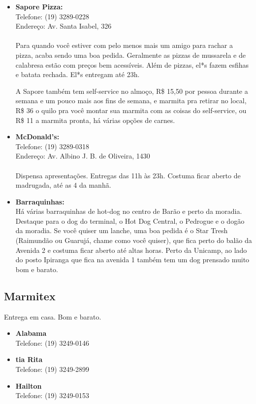 \begin{itemize}
      \item \textbf{Sapore Pizza:}
        \\Telefone: (19) 3289-0228
        \\Endereço: Av. Santa Isabel, 326
        \\\\
        Para quando você estiver com pelo menos mais um amigo para rachar a
        pizza, acaba sendo uma boa pedida. Geralmente as pizzas de mussarela e
        de calabresa estão com preços bem acessíveis. Além de pizzas, el*s fazem
        esfihas e batata rechada. El*s entregam até 23h.

        A Sapore também tem self-service no almoço, R\$ 15,50 por pessoa durante
        a semana e um pouco mais aos fins de semana, e marmita pra retirar no
        local, R\$ 36 o quilo pra você montar sua marmita com as coisas do
        self-service, ou R\$ 11 a marmita pronta, há várias opções de carnes.

    \item   \textbf{McDonald's:}
        \\Telefone: (19) 3289-0318
        \\Endereço: Av. Albino J. B. de Oliveira, 1430
        \\\\
        Dispensa apresentações. Entregas das 11h às 23h. Costuma ficar aberto de
        madrugada, até as 4 da manhã.

    \item   \textbf{Barraquinhas:}
        \\Há várias barraquinhas de hot-dog no centro de Barão e perto da
        moradia. Destaque para o dog do terminal, o Hot Dog Central, o Pedrogue
        e o dogão da moradia. Se você quiser um lanche, uma boa pedida é o Star
        Tresh (Raimundão ou Guarujá, chame como você quiser), que fica perto do
        balão da Avenida 2 e costuma ficar aberto até altas horas. Perto da
        Unicamp, ao lado do posto Ipiranga que fica na avenida 1 também tem um
        dog prensado muito bom e barato.
\end{itemize}

\subsection{Marmitex}

Entrega em casa. Bom e barato.

\begin{itemize}
    \item   \textbf{Alabama}
        \\Telefone: (19) 3249-0146

    \item   \textbf{tia Rita}
        \\Telefone: (19) 3249-2899

    \item   \textbf{Hailton}
        \\Telefone: (19) 3249-0153
\end{itemize}

